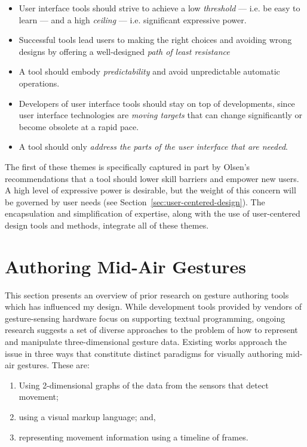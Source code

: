 \begin{itemize}
\item User interface tools should strive to achieve a low \emph{threshold} --- i.e. be easy to learn --- and a high \emph{ceiling} --- i.e. significant expressive power.
\item Successful tools lead users to making the right choices and avoiding wrong designs by offering a well-designed \emph{path of least resistance}
\item A tool should embody \emph{predictability} and avoid unpredictable automatic operations.
\item Developers of user interface tools should stay on top of developments, since user interface technologies are \emph{moving targets} that can change significantly or become obsolete at a rapid pace.
\item A tool should only \emph{address the parts of the user interface that are needed}.
\end{itemize}

The first of these themes is specifically captured in part by Olsen's recommendations that a tool should lower skill barriers and empower new users. A high level of expressive power is desirable, but the weight of this concern will be governed by user needs (see Section~\ref{sec:user-centered-design}). The encapsulation and simplification of expertise, along with the use of user-centered design tools and methods, integrate all of these themes.

\section{Authoring Mid-Air Gestures}

This section presents an overview of prior research on gesture authoring tools which has influenced my design. While development tools provided by vendors of gesture-sensing hardware focus on supporting textual programming, ongoing research suggests a set of diverse approaches to the problem of how to represent and manipulate three-dimensional gesture data. Existing works approach the issue in three ways that constitute distinct paradigms for visually authoring mid-air gestures. These are:

\begin{enumerate}
\item Using 2-dimensional graphs of the data from the sensors that detect movement;
\item using a visual markup language; and,
\item representing movement information using a timeline of
frames.
\end{enumerate}

